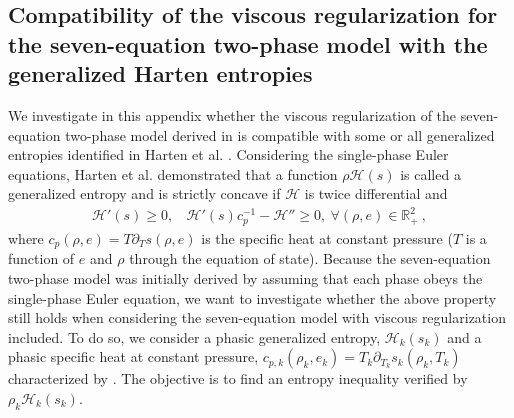 \documentclass[preprint,10pt]{elsarticle}
\begin{document}
\begin{appendices}
\section{Compatibility of the viscous regularization for the seven-equation two-phase model with the generalized Harten entropies}\label{app:harden}
We investigate in this appendix whether the viscous regularization of the seven-equation two-phase model derived in  is compatible with some or all generalized entropies identified in Harten et al. \cite{Harten}. Considering the single-phase Euler equations, Harten et al. \cite{Harten} demonstrated that a function $\rho \mathscr{H}(s)$ is called a generalized entropy and is strictly concave if $\mathscr{H}$ is twice differential and
%
\begin{multline}\label{eq:generalized_ent}
\mathscr{H}' (s)  \geq 0, \ \ \ \ \mathscr{H}'(s)c_p^{-1} - \mathscr{H}'' \geq 0, \ \forall \left( \rho, e \right) \in \mathbb{R}_+^2 \ ,
\end{multline}
%
where $c_p \left( \rho, e \right) = T \partial_T s \left( \rho, e \right)$ is the specific heat at constant pressure ($T$ is a function of $e$ and $\rho$ through the equation of state). Because the seven-equation two-phase model was initially derived by assuming that each phase obeys the single-phase Euler equation, we want to investigate whether the above property still holds when considering the seven-equation model with viscous regularization included. To do so, we consider a phasic generalized entropy, $\mathscr{H}_k(s_k)$ and a phasic specific heat at constant pressure, $c_{p,k} \left( \rho_k, e_k \right) = T_k \partial_{T_k} s_k \left( \rho_k, T_k \right)$ characterized by . The objective is to find an entropy inequality verified by $\rho_k \mathscr{H}_k(s_k)$.


\end{appendices}
\end{document}
